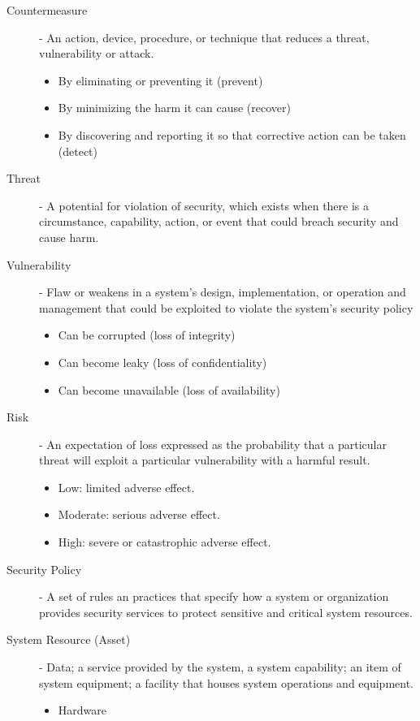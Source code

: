 \documentclass[a4paper]{article}
\begin{document}
\begin{enumerate}
\begin{description}
				\item[Countermeasure] - An action, device, procedure, or technique
					that reduces a threat, vulnerability or attack.
					\begin{itemize}
						\item By eliminating or preventing it (prevent)
						\item By minimizing the harm it can cause (recover)
						\item By discovering and reporting it so that
							corrective action can be taken (detect)
					\end{itemize}
				\item[Threat] - A potential for violation of security, which exists
					when there is a circumstance, capability, action, or event
					that could breach security and cause harm.
				\item[Vulnerability] - Flaw or weakens in a system's design, implementation,
					or operation and management that could be exploited to violate the
					system's security policy
					\begin{itemize}
						\item Can be corrupted (loss of integrity)
						\item Can become leaky (loss of confidentiality)
						\item Can become unavailable (loss of availability)
					\end{itemize}
				\item[Risk] - An expectation of loss expressed as the probability that
					a particular threat will exploit a particular vulnerability
					with a harmful result.
					\begin{itemize}
						\item Low: limited adverse effect.
						\item Moderate: serious adverse effect.
						\item High: severe or catastrophic adverse effect.
					\end{itemize}
				\item[Security Policy] - A set of rules an practices that specify how a
					system or organization provides security services to protect
					sensitive and critical system resources.
				\item[System Resource (Asset)] - Data; a service provided by the system,
					a system capability; an item of system equipment; a facility that
					houses system operations and equipment.
					\begin{itemize}
						\item Hardware

\end{itemize}
\end{description}
\end{enumerate}
\end{document}
